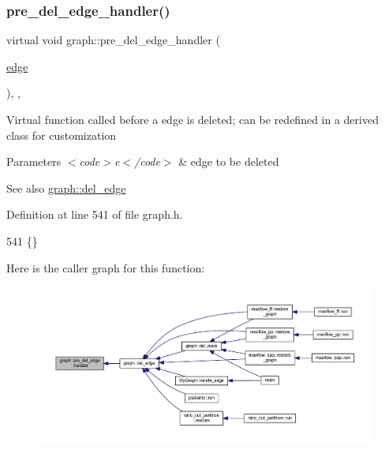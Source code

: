 \subsubsection{\texorpdfstring{pre\+\_\+del\+\_\+edge\+\_\+handler()}{pre\_del\_edge\_handler()}}
{\footnotesize\ttfamily virtual void graph\+::pre\+\_\+del\+\_\+edge\+\_\+handler (\begin{DoxyParamCaption}\item[{\mbox{\hyperlink{classedge}{edge}}}]{ }\end{DoxyParamCaption})\hspace{0.3cm}{\ttfamily [inline]}, {\ttfamily [virtual]}, {\ttfamily [inherited]}}

Virtual function called before a edge is deleted; can be redefined in a derived class for customization


\begin{DoxyParams}{Parameters}
{\em $<$code$>$e$<$/code$>$} & edge to be deleted \\
\hline
\end{DoxyParams}
\begin{DoxySeeAlso}{See also}
\mbox{\hyperlink{classgraph_ad9356508c49c542dfd4b7169297387c6}{graph\+::del\+\_\+edge}} 
\end{DoxySeeAlso}


Definition at line 541 of file graph.\+h.


\begin{DoxyCode}
541 \{\}           
\end{DoxyCode}
Here is the caller graph for this function\+:
\nopagebreak
\begin{figure}[H]
\begin{center}
\leavevmode
\includegraphics[width=350pt]{classgraph_a2cd0986dc5bcbfdbf0635c39e610784b_icgraph}
\end{center}
\end{figure}
\mbox{\label{classgraph_a64699c6cb14cdedab5e13232a8f3e754}} 
